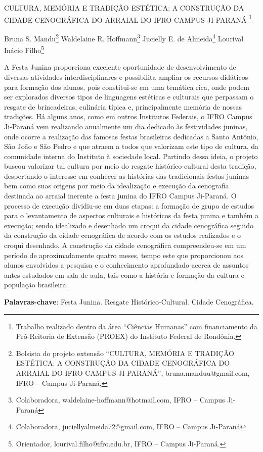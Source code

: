 \documentclass[article,12pt,onesidea,4paper,english,brazil]{abntex2}
\begin{document}
	
	
	\frenchspacing 
	
	\begin{center}
		\LARGE CULTURA, MEMÓRIA E TRADIÇÃO ESTÉTICA: A CONSTRUÇÃO DA CIDADE CENOGRÁFICA DO ARRAIAL DO IFRO CAMPUS JI-PARANÁ \footnote{Trabalho realizado dentro da área “Ciências Humanas” com financiamento da Pró-Reitoria de Extensão (PROEX) do Instituto Federal de Rondônia.}
		
		\normalsize
		Bruna S. Mandu\footnote{Bolsista do projeto extensão “CULTURA, MEMÓRIA E TRADIÇÃO ESTÉTICA: A CONSTRUÇÃO DA CIDADE CENOGRÁFICA DO ARRAIAL DO IFRO CAMPUS JI-PARANÁ”, bruna.manduu@gmail.com, IFRO – Campus Ji-Paraná,} 
		Waldelaine R. Hoffmann\footnote{Colaboradora, waldelaine-hoffmann@hotmail.com, IFRO – Campus Ji-Paraná} 
		Jucielly E. de Almeida\footnote{Colaboradora, juciellyalmeida72@gmail.com, IFRO – Campus Ji-Paraná} 
		Lourival Inácio Filho\footnote{Orientador, lourival.filho@ifro.edu.br, IFRO – Campus Ji-Paraná.} 
	\end{center}
	
	\noindent A Festa Junina proporciona excelente oportunidade de desenvolvimento de diversas atividades interdisciplinares e possibilita ampliar os recursos didáticos para formação dos alunos, pois constitui-se em uma temática rica, onde podem ser explorados diversos tipos de linguagens estéticas e culturais que perpassam o resgate de brincadeiras, culinária típica e, principalmente memória de nossas tradições. Há alguns anos, como em outros Institutos Federais, o IFRO Campus Ji-Paraná vem realizando anualmente um dia dedicado às festividades juninas, onde ocorre a realização das famosas festas brasileiras dedicadas a Santo Antônio, São João e São Pedro e que atraem a todos que valorizam este tipo de cultura, da comunidade interna do Instituto à sociedade local. Partindo dessa ideia, o projeto buscou valorizar tal cultura por meio do resgate histórico-cultural desta tradição, despertando o interesse em conhecer as histórias das tradicionais festas juninas bem como suas origens por meio da idealização e execução da cenografia destinada ao arraial inerente a festa junina do IFRO Campus Ji-Paraná. O processo de execução dividiu-se em duas etapas: a formação de grupo de estudos para o levantamento de aspectos culturais e históricos da festa junina e também a execução; sendo idealizado e desenhado um croqui da cidade cenográfica seguido da construção da cidade cenográfica de acordo com os estudos realizados e o croqui desenhado. A construção da cidade cenográfica compreendeu-se em um período de aproximadamente quatro meses, tempo este que proporcionou aos alunos envolvidos a pesquisa e o conhecimento aprofundado acerca de assuntos antes estudados em sala de aula, tais como a história e formação da cultura e população brasileira.
	
	\vspace{\onelineskip}
	
	\noindent
	\textbf{Palavras-chave}: Festa Junina. Resgate Histórico-Cultural. Cidade Cenográfica.
	
\end{document}

